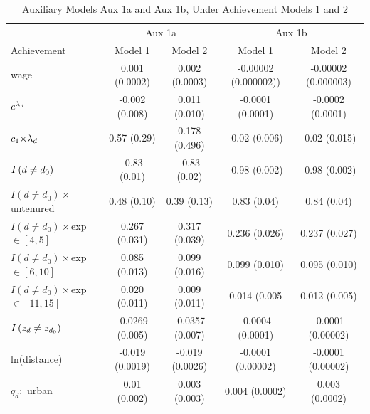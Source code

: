 \documentclass[notitlepage,12pt]{article}%
\begin{document}
\begin{table}[ptb]
\caption{Auxiliary Models Aux 1a and Aux 1b, Under Achievement Models 1 and 2}%
\label{tab:aux_model1_2}
\begin{center}%
\begin{tabular}
[c]{lcccc}\hline\hline
& \multicolumn{2}{c}{{\small Aux 1a}} & \multicolumn{2}{c}{{\small Aux 1b}}\\
{\small Achievement } & {\small Model 1} & {\small Model 2} & {\small Model 1}
& {\small Model 2}\\\hline
{\small wage} & {\small 0.001 (0.0002)} & {\small 0.002 (0.0003)} &
{\small -0.00002 (0.000002))} & {\small -0.00002 (0.000003)}\\
${\small e}^{\lambda_{d}}$ & {\small -0.002 (0.008)} & {\small 0.011 (0.010)}
& {\small -0.0001 (0.0001)} & {\small -0.0002 (0.0001)}\\
${\small c}_{1}{\small \times\lambda}_{d}$ & {\small 0.57 (0.29)} &
{\small 0.178 (0.496)} & {\small -0.02 (0.006)} & {\small -0.02 (0.015)}\\
${\small I}\left(  d\neq d_{0}\right)  $ & {\small -0.83 (0.01)} &
{\small -0.83 (0.02)} & {\small -0.98 (0.002)} & {\small -0.98 (0.002)}\\
$I\left(  d\neq d_{0}\right)  \times${\small untenured} & {\small 0.48 (0.10)}
& {\small 0.39 (0.13)} & {\small 0.83 (0.04)} & {\small 0.84 (0.04)}\\
$I\left(  d\neq d_{0}\right)  \times${\small exp $\in[4,5]$} & {\small 0.267
(0.031)} & {\small 0.317 (0.039)} & {\small 0.236 (0.026)} & {\small 0.237
(0.027)}\\
$I\left(  d\neq d_{0}\right)  \times${\small exp $\in[6,10]$} & {\small 0.085
(0.013)} & {\small 0.099 (0.016)} & {\small 0.099 (0.010)} & {\small 0.095
(0.010)}\\
$I\left(  d\neq d_{0}\right)  \times${\small exp $\in[11,15]$} & {\small 0.020
(0.011)} & {\small 0.009 (0.011)} & {\small 0.014 (0.005} & {\small 0.012
(0.005)}\\
${\small I}\left(  z_{d}\neq z_{d_{0}}\right)  $ & {\small -0.0269 (0.005)} &
{\small -0.0357 (0.007)} & {\small -0.0004 (0.0001)} & {\small -0.0001
(0.00002)}\\
{\small ln(distance)} & {\small -0.019 (0.0019)} & {\small -0.019 (0.0026)} &
{\small -0.0001 (0.00002)} & {\small -0.0001 (0.00002)}\\
$q_{d}:$ {\small urban} & {\small 0.01 (0.002)} & {\small 0.003 (0.003)} &
{\small 0.004 (0.0002)} & {\small 0.003 (0.0002)}\\

\end{tabular}
\end{center}
\end{table}
\end{document}
